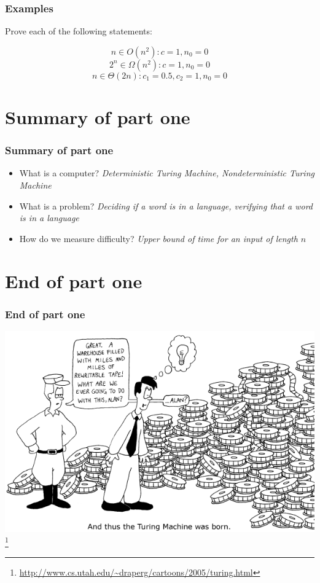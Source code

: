 \documentclass[aspectratio=169]{beamer}
\begin{document}
\begin{frame}[noframenumbering]
\frametitle{Examples}
Prove each of the following statements:

$$n \in O(n^2): c = 1, n_0 = 0$$
$$2^n \in \Omega(n^2): c = 1, n_0 = 0$$
$$n \in \Theta(2n): c_1 = 0.5, c_2 = 1, n_0 = 0$$
\end{frame}

\section{Summary of part one}

\begin{frame}
\frametitle{Summary of part one}
\begin{itemize}
    \item What is a computer? {\em Deterministic Turing Machine, Nondeterministic Turing Machine}
    \item What is a problem? {\em Deciding if a word is in a language, verifying that a word is in a language}
    \item How do we measure difficulty? {\em Upper bound of time for an input of length $n$}
\end{itemize}
\end{frame}

\section{End of part one}

\begin{frame}
\frametitle{End of part one}
\begin{center}
\includegraphics{turing_comic}\footnote{\url{http://www.cs.utah.edu/~draperg/cartoons/2005/turing.html}}
\end{center}
\end{frame}
\end{document}
